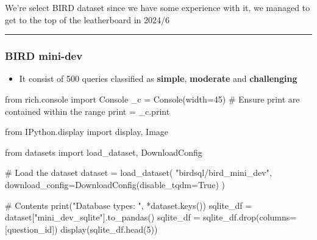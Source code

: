 \documentclass[
  letterpaper,
  DIV=11,
  numbers=noendperiod]{scrartcl}
\newenvironment{Shaded}{\begin{snugshade}}{\end{snugshade}}
\newcommand{\BuiltInTok}[1]{\textcolor[rgb]{0.00,0.23,0.31}{#1}}
\newcommand{\CommentTok}[1]{\textcolor[rgb]{0.37,0.37,0.37}{#1}}
\newcommand{\DecValTok}[1]{\textcolor[rgb]{0.68,0.00,0.00}{#1}}
\newcommand{\ImportTok}[1]{\textcolor[rgb]{0.00,0.46,0.62}{#1}}
\newcommand{\NormalTok}[1]{\textcolor[rgb]{0.00,0.23,0.31}{#1}}
\newcommand{\OperatorTok}[1]{\textcolor[rgb]{0.37,0.37,0.37}{#1}}
\newcommand{\StringTok}[1]{\textcolor[rgb]{0.13,0.47,0.30}{#1}}
\newcommand{\VariableTok}[1]{\textcolor[rgb]{0.07,0.07,0.07}{#1}}
\providecommand{\tightlist}{%
  \setlength{\itemsep}{0pt}\setlength{\parskip}{0pt}}
\begin{document}
We're select BIRD dataset since we have some experience with it, we
managed to get to the top of the leatherboard in 2024/6

\begin{center}\rule{0.5\linewidth}{0.5pt}\end{center}

\subsubsection{BIRD mini-dev}\label{bird-mini-dev}

\begin{itemize}
\tightlist
\item
  It consist of 500 queries classified as \textbf{simple},
  \textbf{moderate} and \textbf{challenging}
  \href{https://github.com/bird-bench/mini_dev}{}
\end{itemize}

\begin{Shaded}
\begin{Highlighting}[]
\ImportTok{from}\NormalTok{ rich.console }\ImportTok{import}\NormalTok{ Console}
\NormalTok{\_c }\OperatorTok{=}\NormalTok{ Console(width}\OperatorTok{=}\DecValTok{45}\NormalTok{)}
\CommentTok{\# Ensure print are contained within the range}
\BuiltInTok{print} \OperatorTok{=}\NormalTok{ \_c.}\BuiltInTok{print}


\ImportTok{from}\NormalTok{ IPython.display }\ImportTok{import}\NormalTok{ display, Image}
\end{Highlighting}
\end{Shaded}

\begin{Shaded}
\begin{Highlighting}[]
\ImportTok{from}\NormalTok{ datasets }\ImportTok{import}\NormalTok{ load\_dataset, DownloadConfig }

\CommentTok{\# Load the dataset}
\NormalTok{dataset }\OperatorTok{=}\NormalTok{ load\_dataset(}
  \StringTok{"birdsql/bird\_mini\_dev"}\NormalTok{, }
\NormalTok{  download\_config}\OperatorTok{=}\NormalTok{DownloadConfig(disable\_tqdm}\OperatorTok{=}\VariableTok{True}\NormalTok{)}
\NormalTok{)}

\CommentTok{\# Contents}
\BuiltInTok{print}\NormalTok{(}\StringTok{"Database types: "}\NormalTok{, }\OperatorTok{*}\NormalTok{dataset.keys())}
\NormalTok{sqlite\_df }\OperatorTok{=}\NormalTok{ dataset[}\StringTok{"mini\_dev\_sqlite"}\NormalTok{].to\_pandas()}
\NormalTok{sqlite\_df }\OperatorTok{=}\NormalTok{ sqlite\_df.drop(columns}\OperatorTok{=}\NormalTok{[}\StringTok{\textquotesingle{}question\_id\textquotesingle{}}\NormalTok{])}
\NormalTok{display(sqlite\_df.head(}\DecValTok{5}\NormalTok{))}
\end{Highlighting}
\end{Shaded}
\end{document}
